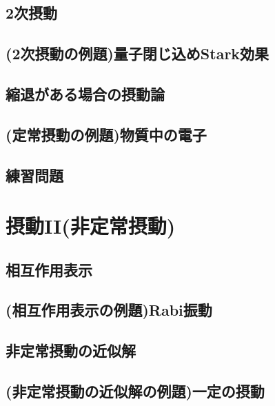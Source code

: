 \documentclass{report}
\begin{document}
      \subsection{2次摂動}
        
      \subsection{(2次摂動の例題)量子閉じ込めStark効果}
        
      \subsection{縮退がある場合の摂動論}
        
      \subsection{(定常摂動の例題)物質中の電子}
        
      \subsection{練習問題}
        
    \section{摂動II(非定常摂動)}
      
      \subsection{相互作用表示}
        
      \subsection{(相互作用表示の例題)Rabi振動}
        
      \subsection{非定常摂動の近似解}
        
      \subsection{(非定常摂動の近似解の例題)一定の摂動}
        
\end{document}
